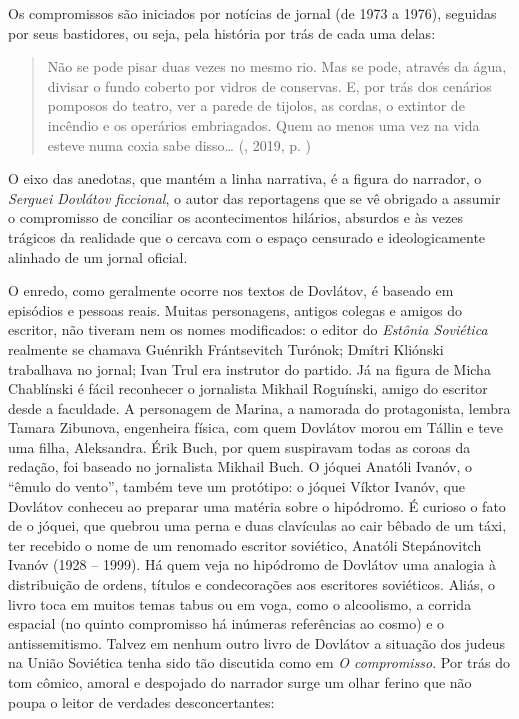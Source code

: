Os compromissos são iniciados por notícias de jornal (de 1973 a 1976),
seguidas por seus bastidores, ou seja, pela história por trás de cada
uma delas:

\begin{quotation}
Não se pode pisar duas vezes no mesmo rio. Mas se pode, através da água,
divisar o fundo coberto por vidros de conservas. E, por trás dos
cenários pomposos do teatro, ver a parede de tijolos, as cordas, o
extintor de incêndio e os operários embriagados. Quem ao menos uma vez
na vida esteve numa coxia sabe disso\ldots{} 
{}(, 2019, p. \pageref{ref0})
\end{quotation}

O eixo das anedotas, que mantém a linha narrativa, é a figura do
narrador, o \emph{Serguei Dovlátov ficcional}, o autor das reportagens
que se vê obrigado a assumir o compromisso de conciliar os
acontecimentos hilários, absurdos e às vezes trágicos da realidade que o
cercava com o espaço censurado e ideologicamente alinhado de um jornal
oficial.

O enredo, como geralmente ocorre nos textos de Dovlátov, é baseado em
episódios e pessoas reais. Muitas personagens, antigos colegas e amigos
do escritor, não tiveram nem os nomes modificados: o editor do
\emph{Estônia Soviética} realmente se chamava Guénrikh Frántsevitch
Turónok; Dmítri Kliónski trabalhava no jornal; Ivan Trul era instrutor
do partido. Já na figura de Micha Chablínski é fácil reconhecer o
jornalista Mikhail Roguínski, amigo do escritor desde a faculdade. A
personagem de Marina, a namorada do protagonista, lembra Tamara
Zibunova, engenheira física, com quem Dovlátov morou em Tállin e teve
uma filha, Aleksandra. Érik Buch, por quem suspiravam todas as coroas da
redação, foi baseado no jornalista Mikhail Buch. O jóquei Anatóli
Ivanóv, o ``êmulo do vento'', também teve um protótipo: o jóquei Víktor
Ivanóv, que Dovlátov conheceu ao preparar uma matéria sobre o hipódromo.
É curioso o fato de o jóquei, que quebrou uma perna e duas clavículas ao
cair bêbado de um táxi, ter recebido o nome de um renomado escritor
soviético, Anatóli Stepánovitch Ivanóv (1928 -- 1999). Há quem veja no
hipódromo de Dovlátov uma analogia à distribuição de ordens, títulos e
condecorações aos escritores soviéticos. Aliás, o livro toca em muitos
temas tabus ou em voga, como o alcoolismo, a corrida espacial (no quinto
compromisso há inúmeras referências ao cosmo) e o antissemitismo. Talvez
em nenhum outro livro de Dovlátov a situação dos judeus na União
Soviética tenha sido tão discutida como em \emph{O compromisso}. Por trás
do tom cômico, amoral e despojado do narrador surge um olhar ferino que
não poupa o leitor de verdades desconcertantes:

